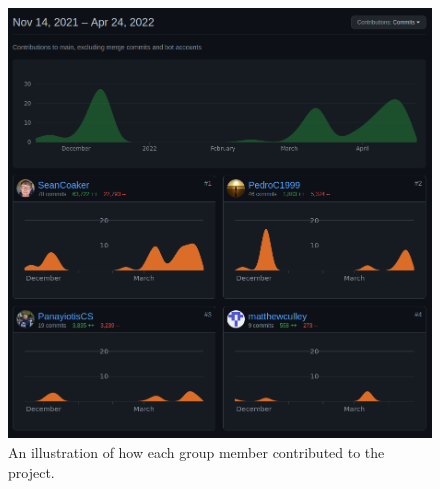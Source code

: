 \begin{figure}[H]
	\centering
	\captionsetup{width=1.0\linewidth}


	\includegraphics[width=1.0\linewidth]{graphics/git_contributions.png}

	\caption[Git Repository Contributions]{An illustration of how each group member contributed to the project.}

	\label{fig:git}

\end{figure}